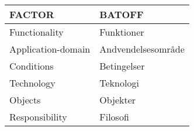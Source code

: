 \begin{tabularx}{\linewidth}{XX}
    \toprule
    FACTOR & BATOFF \\\midrule
    Functionality & Funktioner \\
    Application-domain & Andvendelsesområde\\
    Conditions & Betingelser \\
    Technology & Teknologi \\
    Objects & Objekter \\
    Responsibility & Filosofi \\ \bottomrule
\end{tabularx}